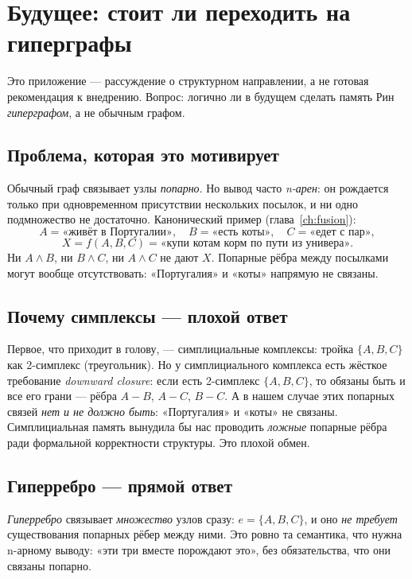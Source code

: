 \chapter{Будущее: стоит ли переходить на гиперграфы}
\label{ch:hypergraphs}

Это приложение — рассуждение о структурном направлении, а не готовая рекомендация к
внедрению. Вопрос: логично ли в будущем сделать память Рин \emph{гиперграфом}, а не
обычным графом.

\section{Проблема, которая это мотивирует}

Обычный граф связывает узлы \emph{попарно}. Но вывод часто \emph{n-арен}: он рождается
только при одновременном присутствии нескольких посылок, и ни одно подмножество не
достаточно. Канонический пример (глава~\ref{ch:fusion}):
\[
A=\text{«живёт в Португалии»},\quad B=\text{«есть коты»},\quad C=\text{«едет с пар»},
\]
\[
X=f(A,B,C)=\text{«купи котам корм по пути из универа»}.
\]
Ни $A\wedge B$, ни $B\wedge C$, ни $A\wedge C$ не дают $X$. Попарные рёбра между
посылками могут вообще отсутствовать: «Португалия» и «коты» напрямую не связаны.

\section{Почему симплексы — плохой ответ}

Первое, что приходит в голову, — симплициальные комплексы: тройка $\{A,B,C\}$ как
2-симплекс (треугольник). Но у симплициального комплекса есть жёсткое требование
\emph{downward closure}: если есть 2-симплекс $\{A,B,C\}$, то обязаны быть и все его
грани — рёбра $A\!-\!B$, $A\!-\!C$, $B\!-\!C$. А в нашем случае этих попарных связей
\emph{нет и не должно быть}: «Португалия» и «коты» не связаны. Симплициальная память
вынудила бы нас проводить \emph{ложные} попарные рёбра ради формальной корректности
структуры. Это плохой обмен.

\section{Гиперребро — прямой ответ}

\emph{Гиперребро} связывает \emph{множество} узлов сразу: $e=\{A,B,C\}$, и оно
\emph{не требует} существования попарных рёбер между ними. Это ровно та семантика,
что нужна n-арному выводу: «эти три вместе порождают это», без обязательства, что
они связаны попарно.

